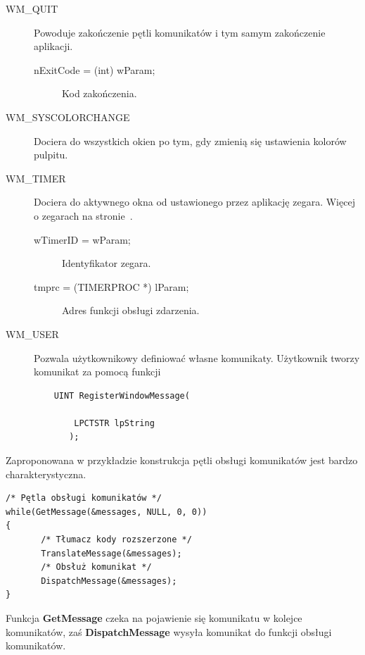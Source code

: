 \begin{description}
\item[WM\_QUIT] Powoduje zakończenie pętli komunikatów i tym samym zakończenie aplikacji.

        \begin{description}
		\item[nExitCode = (int) wParam;] Kod zakończenia.
	\end{description}

\item[WM\_SYSCOLORCHANGE] Dociera do wszystkich okien po tym, gdy zmienią się ustawienia kolorów pulpitu.

\item[WM\_TIMER] Dociera do aktywnego okna od ustawionego przez aplikację zegara. Więcej o zegarach 
		na stronie~\pageref{subsubsection_zegary}.

	\begin{description}
		\item[wTimerID = wParam;] Identyfikator zegara.
		\item[tmprc = (TIMERPROC *) lParam;] Adres funkcji obsługi zdarzenia.
	\end{description}
 
\item[WM\_USER] Pozwala użytkownikowy definiować własne komunikaty. Użytkownik tworzy komunikat
	za pomocą funkcji 

	\begin{scriptsize}
	\begin{verbatim}
	UINT RegisterWindowMessage(

	    LPCTSTR lpString 	
	   );	
	\end{verbatim}
	\end{scriptsize}

\end{description}

\label{apiPetlaObslugiKomunikatow}
Zaproponowana w przykładzie konstrukcja pętli obsługi komunikatów jest bardzo charakterystyczna.
\begin{scriptsize}
\begin{verbatim}
/* Pętla obsługi komunikatów */
while(GetMessage(&messages, NULL, 0, 0))
{
       /* Tłumacz kody rozszerzone */
       TranslateMessage(&messages);
       /* Obsłuż komunikat */
       DispatchMessage(&messages);
}
\end{verbatim}
\end{scriptsize}

Funkcja {\bf GetMessage} czeka na pojawienie się komunikatu w kolejce komunikatów, zaś
{\bf DispatchMessage} wysyła komunikat do funkcji obsługi komunikatów. 

